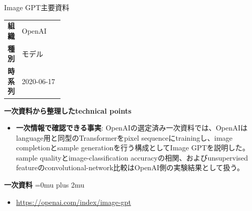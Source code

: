 \begin{technicalnote}{Image GPT}{主要資料}
\begingroup
\begin{tabularx}{\linewidth}{@{}>{\bfseries}p{0.22\linewidth}X@{}}
組織 & OpenAI \\
種別 & モデル \\
時系列 & 2020-06-17 \\
\end{tabularx}
\smallskip
\begin{minipage}{\linewidth}
{\bfseries 一次資料から整理したtechnical points}
\begin{itemize}[leftmargin=1.5em,itemsep=0.35em]
\item \textbf{一次情報で確認できる事実}: OpenAIの選定済み一次資料では、OpenAIはlanguage用と同型のTransformerをpixel sequenceにtrainingし、image completionとsample generationを行う構成としてImage GPTを説明した。 sample qualityとimage-classification accuracyの相関、およびunsupervised featureのconvolutional-network比較はOpenAI側の実験結果として扱う。
\end{itemize}
\begin{samepage}
{\bfseries 一次資料}
\begingroup\sloppy
\Urlmuskip=0mu plus 2mu\relax
\begin{itemize}[leftmargin=1.5em,itemsep=0.25em]
\item {\scriptsize\url{https://openai.com/index/image-gpt}}
\end{itemize}
\endgroup
\end{samepage}
\end{minipage}
\endgroup
\end{technicalnote}
\medskip

